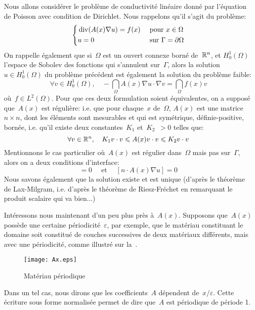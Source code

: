 Nous allons considérer le problème de conductivité linéaire donné par l'équation de Poisson avec condition de Dirichlet. Nous rappelons qu'il s'agit du problème:
\begin{equation}
\left\{
\begin{aligned}
&\operatorname{div}(A(x)\nabla u) = f(x)&&\text{ pour } x\in\Omega\\
&u=0 &&\text{ sur } \Gamma=\partial\Omega
\end{aligned}
\right.
\end{equation}
On rappelle également que si~$\Omega$ est un ouvert connexe borné de~$\mathbb R^n$, et $H_0^1(\Omega)$ l'espace de Sobolev des fonctions qui s'annulent sur~$\Gamma$, alors la solution $u\in H_0^1(\Omega)$ du problème précédent est également la solution du problème faible:
\begin{equation}
\forall v\in H_0^1(\Omega),\quad -\dint_\Omega A(x)\nabla u\cdot\nabla v = \dint_\Omega f(x)v
\end{equation}
où~$f\in L^2(\Omega)$.
Pour que ces deux formulation soient équivalentes, on a supposé que~$A(x)$ est régulière: i.e. que pour chaque~$x$ de~$\Omega$, $A(x)$ est une matrice~$n\times n$, dont les éléments sont mesurables et qui est symétrique, définie-positive, bornée, i.e. qu'il existe deux constantes~$K_1$ et~$K_2$~$>0$ telles que:
\begin{equation}\forall v\in\mathbb R^n,\quad K_1 v\cdot v \leqslant A(x) v\cdot v \leqslant K_2 v\cdot v\end{equation}
Mentionnons le cas particulier où~$A(x)$ est régulier dans~$\Omega$ mais pas sur~$\Gamma$, alors on a deux conditions d'interface:
\begin{equation}
[u]=0 \quad\text{ et }\quad [n\cdot A(x)\nabla u]=0
\end{equation}
Nous savons également que la solution existe et est unique (d'après le théorème de Lax-Milgram, i.e. d'après le théorème de Riesz-Fréchet en remarquant le produit scalaire qui va bien...)

\medskip
Intéressons nous maintenant d'un peu plus près à~$A(x)$.
Supposons que~$A(x)$ possède une certaine périodicité~$\varepsilon$, par exemple, que le matériau constituant le domaine soit constitué de couches successives de deux matériaux différents, mais avec une périodicité, comme illustré sur la~.
\begin{figure}[ht]
\centering\texttt{[image: Ax.eps]}
\caption{Matériau périodique}\label{Fig-Ax}
\end{figure}
Dans un tel cas, nous dirons que les coefficients~$A$ dépendent de~$x/\varepsilon$. Cette écriture sous forme normalisée permet de dire que~$A$ est périodique de période 1.

